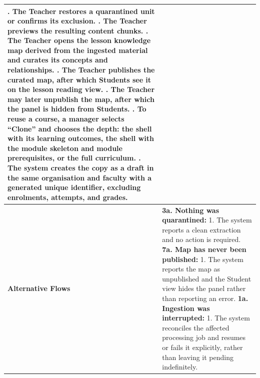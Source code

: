 \begin{longtable}{|>{\raggedright\arraybackslash}p{}|>{\raggedright\arraybackslash}p{}|}
4. The Teacher restores a quarantined unit or confirms its exclusion. \newline
5. The Teacher previews the resulting content chunks. \newline
6. The Teacher opens the lesson knowledge map derived from the ingested material and curates its concepts and relationships. \newline
7. The Teacher publishes the curated map, after which Students see it on the lesson reading view. \newline
8. The Teacher may later unpublish the map, after which the panel is hidden from Students. \newline
9. To reuse a course, a manager selects ``Clone'' and chooses the depth: the shell with its learning outcomes, the shell with the module skeleton and module prerequisites, or the full curriculum. \newline
10. The system creates the copy as a draft in the same organisation and faculty with a generated unique identifier, excluding enrolments, attempts, and grades. \\ \hline
\textbf{Alternative Flows} &
\textbf{3a. Nothing was quarantined:} \newline
\hspace*{1em}1. The system reports a clean extraction and no action is required. \newline
\textbf{7a. Map has never been published:} \newline
\hspace*{1em}1. The system reports the map as unpublished and the Student view hides the panel rather than reporting an error. \newline
\textbf{1a. Ingestion was interrupted:} \newline
\hspace*{1em}1. The system reconciles the affected processing job and resumes or fails it explicitly, rather than leaving it pending indefinitely. \\
\end{longtable}

